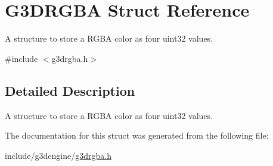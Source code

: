 \hypertarget{structG3DRGBA}{}\section{G3\+D\+R\+G\+BA Struct Reference}
\label{structG3DRGBA}


A structure to store a R\+G\+BA color as four uint32 values.  




{\ttfamily \#include $<$g3drgba.\+h$>$}



\subsection{Detailed Description}
A structure to store a R\+G\+BA color as four uint32 values. 

The documentation for this struct was generated from the following file\+:\begin{DoxyCompactItemize}
\item 
include/g3dengine/\hyperlink{g3drgba_8h}{g3drgba.\+h}\end{DoxyCompactItemize}
